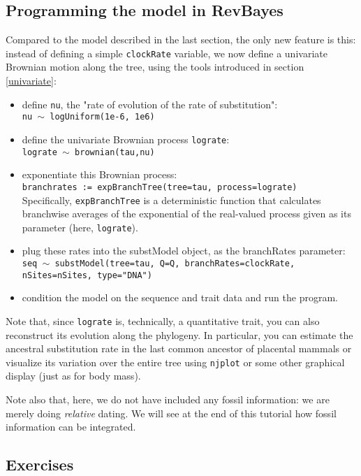 \documentclass[usletter]{article}
\newcommand{\cmd}[1]{\texttt{#1}}
\begin{document}
\subsection*{Programming the model in RevBayes}

Compared to the model described in the last section, the only new feature is this: instead of defining a simple \cmd{clockRate} variable, we now define a univariate Brownian motion along the tree, using the tools introduced in section \ref{univariate}:
\begin{itemize}
\item
define \cmd{nu}, the "rate of evolution of the rate of substitution":
\\
\cmd{nu $\sim$ logUniform(1e-6, 1e6)}
\item
define the univariate Brownian process \cmd{lograte}:
\\
\cmd{lograte $\sim$ brownian(tau,nu)}
\item
exponentiate this Brownian process:
\\
\cmd{branchrates := expBranchTree(tree=tau, process=lograte)}
\\
Specifically, \cmd{expBranchTree} is a deterministic function that calculates branchwise averages of the exponential of the real-valued process given as its parameter (here, \cmd{lograte}).
\item
plug these rates into the substModel object, as the branchRates parameter:
\\
\cmd{seq $\sim$ substModel(tree=tau, Q=Q, branchRates=clockRate, nSites=nSites, type="DNA")}
\item
condition the model on the sequence and trait data and run the program.
\end{itemize}
Note that, since \cmd{lograte} is, technically, a quantitative trait, you can also reconstruct its evolution along the phylogeny. In particular, you can estimate the ancestral substitution rate in the last common ancestor of placental mammals or visualize its variation over the entire tree using \cmd{njplot} or some other graphical display (just as for body mass).

Note also that, here, we do not have included any fossil information: we are merely doing \emph{relative} dating. We will see at the end of this tutorial how fossil information can be integrated.

\subsection*{Exercises}
\end{document}
